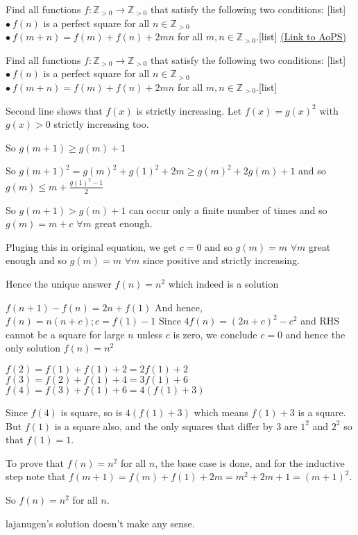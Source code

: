 \begin{problem}
	Find all functions $f:\mathbb{Z}_{>0}\rightarrow\mathbb{Z}_{>0}$ that satisfy the following two conditions:
[list]$\bullet\ f(n)$ is a perfect square for all $n\in\mathbb{Z}_{>0}$
$\bullet\ f(m+n)=f(m)+f(n)+2mn$ for all $m,n\in\mathbb{Z}_{>0}$.[\/list]
	\flushright \href{https://artofproblemsolving.com/community/c6h388897}{(Link to AoPS)}
\end{problem}



\begin{solution}
	\begin{tcolorbox}Find all functions $f:\mathbb{Z}_{>0}\rightarrow\mathbb{Z}_{>0}$ that satisfy the following two conditions:
[list]$\bullet\ f(n)$ is a perfect square for all $n\in\mathbb{Z}_{>0}$
$\bullet\ f(m+n)=f(m)+f(n)+2mn$ for all $m,n\in\mathbb{Z}_{>0}$.[\/list]\end{tcolorbox}
Second line shows that $f(x)$ is strictly increasing.
Let $f(x)=g(x)^2$ with $g(x)>0$ strictly increasing too.

So $g(m+1)\ge g(m)+1$

So $g(m+1)^2=g(m)^2+g(1)^2+2m\ge g(m)^2+2g(m)+1$ and so $g(m)\le m+\frac{g(1)^2-1}2$

So $g(m+1)>g(m)+1$ can occur only a finite number of times and so $g(m)=m+c$ $\forall m$ great enough.

Pluging this in original equation, we get $c=0$ and so $g(m)=m$ $\forall m$ great enough and so $g(m)=m$ $\forall m$ since positive and strictly increasing.

Hence the unique answer $\boxed{f(n)=n^2}$ which indeed is a solution
\end{solution}



\begin{solution}
	$f(n+1)-f(n)=2n+f(1)$
And hence, $f(n)=n(n+c) ; c=f(1)-1$
Since $4f(n)=(2n+c)^2-c^2$ and RHS cannot be a square for large $n$ unless $c$ is zero, we conclude $c=0$ and hence the only solution $f(n)=n^2$
\end{solution}



\begin{solution}
	$f(2)=f(1)+f(1)+2=2f(1)+2$
$f(3)=f(2)+f(1)+4=3f(1)+6$
$f(4)=f(3)+f(1)+6=4(f(1)+3)$

Since $f(4)$ is square, so is $4(f(1)+3)$ which means $f(1)+3$ is a square. But $f(1)$ is a square also, and the only squares that differ by $3$ are $1^2$ and $2^2$ so that $f(1)=1$.

To prove that $f(n)=n^2$ for all $n$, the base case is done, and for the inductive step note that $f(m+1)=f(m)+f(1)+2m=m^2+2m+1=(m+1)^2$.

So $f(n)=n^2$ for all $n$.

lajanugen's solution doesn't make any sense.
\end{solution}



